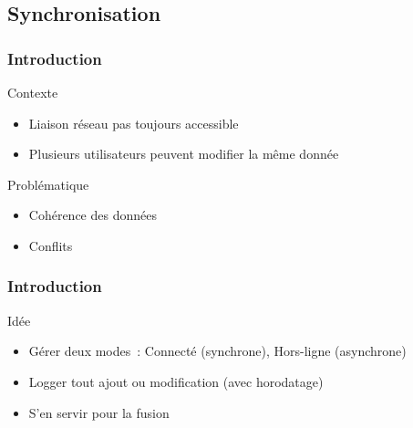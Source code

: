 \subsection{Synchronisation}

\begin{frame}
\tableofcontents[subsectionstyle=show/shaded/hide, subsubsectionstyle=hide, sectionstyle=show/hide]
\end{frame}

\begin{frame}
\frametitle{Introduction}

\begin{block}{Contexte}
\begin{itemize}
    \item Liaison réseau pas toujours accessible %
    \item Plusieurs utilisateurs peuvent modifier la même donnée %
\end{itemize}
\end{block}

\pause

\begin{alertblock}{Problématique}
\begin{itemize}
    \item Cohérence des données
    \item Conflits
\end{itemize}
\end{alertblock}

\end{frame}

\begin{frame}
\frametitle{Introduction}

\begin{exampleblock}{Idée}
\begin{itemize}
    \item Gérer deux modes~: Connecté (synchrone), Hors-ligne (asynchrone)
    \item Logger tout ajout ou modification (avec horodatage)
    \item S'en servir pour la fusion
\end{itemize}
\end{exampleblock}

\end{frame} %

